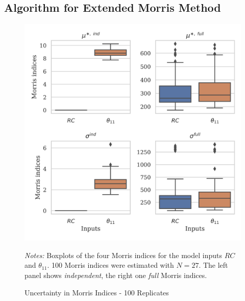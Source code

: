 \subsection{Algorithm for Extended Morris Method}

\begin{figure}[t]
	\caption{Uncertainty in Morris Indices - 100 Replicates}
    \label{morris_replicates}
    \begin{centering}
	\vspace*{-4mm}
	\begin{centering}
	\includegraphics[scale=0.9]{../figures/boxplot_morris_replicates_100_replicates_27_draws.png}
    \end{centering}
    \end{centering}

    \small
    \textit{Notes:} Boxplots of the four Morris indices for the model inputs $RC$ and $\theta_{11}$. 100 Morris indices were estimated with $N=27$. The left panel shows \textit{independent}, the right one \textit{full} Morris indices.
\end{figure}


